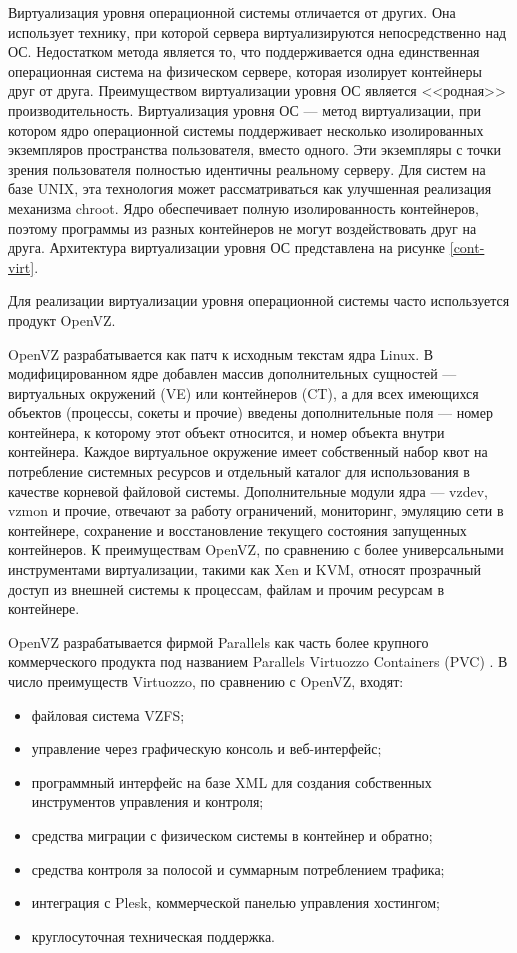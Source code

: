 Виртуализация уровня операционной системы отличается от других.
Она использует технику, при которой сервера виртуализируются непосредственно над ОС.
Недостатком метода является то, что поддерживается одна единственная операционная система на физическом сервере, которая изолирует контейнеры друг от друга.
Преимуществом виртуализации уровня ОС является <<родная>> производительность.
Виртуализация уровня ОС --- метод виртуализации, при котором ядро операционной системы поддерживает несколько изолированных экземпляров пространства пользователя, вместо одного.
Эти экземпляры с точки зрения пользователя полностью идентичны реальному серверу.
Для систем на базе UNIX, эта технология может рассматриваться как улучшенная реализация механизма chroot.
Ядро обеспечивает полную изолированность контейнеров, поэтому программы из разных контейнеров не могут воздействовать друг на друга.
Архитектура виртуализации уровня ОС представлена на рисунке \ref{cont-virt}.

Для реализации виртуализации уровня операционной системы часто используется продукт OpenVZ.

OpenVZ разрабатывается как патч к исходным текстам ядра Linux.
В модифицированном ядре добавлен массив дополнительных сущностей --- виртуальных окружений (VE) или контейнеров (CT), а для всех имеющихся объектов (процессы, сокеты и прочие) введены дополнительные поля --- номер контейнера, к которому этот объект относится, и номер объекта внутри контейнера.
Каждое виртуальное окружение имеет собственный набор квот на потребление системных ресурсов и отдельный каталог для использования в качестве корневой файловой системы.
Дополнительные модули ядра --- vzdev, vzmon и прочие, отвечают за работу ограничений, мониторинг, эмуляцию сети в контейнере, сохранение и восстановление текущего состояния запущенных контейнеров.
К преимуществам OpenVZ, по сравнению с более универсальными инструментами виртуализации, такими как Xen и KVM, относят прозрачный доступ из внешней системы к процессам, файлам и прочим ресурсам в контейнере.

OpenVZ разрабатывается фирмой Parallels как часть более крупного коммерческого продукта под названием Parallels Virtuozzo Containers (PVC) \cite{lxc-openvz}.
В число преимуществ Virtuozzo, по сравнению с OpenVZ, входят:
\begin{itemize}
  \item файловая система VZFS;
  \item управление через графическую консоль и веб-интерфейс;
  \item программный интерфейс на базе XML для создания собственных инструментов управления и контроля;
  \item средства миграции с физическом системы в контейнер и обратно;
  \item средства контроля за полосой и суммарным потреблением трафика;
  \item интеграция с Plesk, коммерческой панелью управления хостингом;
  \item круглосуточная техническая поддержка.
\end{itemize}

